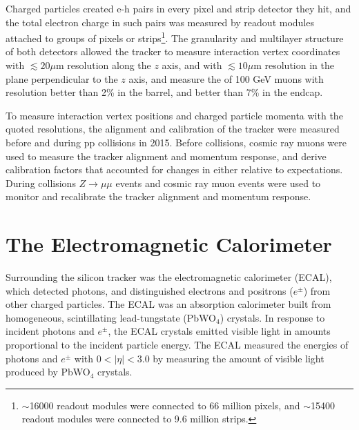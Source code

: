 Charged particles created e-h pairs in every pixel and strip detector they hit, and the total electron charge in such pairs was measured by readout 
modules attached to groups of pixels or strips\footnote{$\sim$16000 readout modules were connected to 66 million pixels, 
and $\sim$15400 readout modules were connected to 9.6 million strips.}.  
The granularity and multilayer structure of both detectors allowed the tracker to measure interaction vertex coordinates 
with $\lesssim 20\mu$m resolution along the $z$ axis, and with $\lesssim 10\mu$m resolution in the plane perpendicular to 
the $z$ axis, and measure the \pt of 100 GeV \pt muons with resolution better than 2\% in the barrel, and better than 
7\% in the endcap.

To measure interaction vertex positions and charged particle momenta with the quoted resolutions, the alignment and calibration 
of the tracker were measured before and during pp collisions in 2015.  Before collisions, cosmic ray muons were 
used to measure the tracker alignment and momentum response, and derive calibration factors that accounted for 
changes in either relative to expectations.  During collisions $Z \rightarrow \mu\mu$ events and cosmic ray muon events 
were used to monitor and recalibrate the tracker alignment and momentum response.


\section{The Electromagnetic Calorimeter}
\label{sec:ecalDescription}

Surrounding the silicon tracker was the electromagnetic calorimeter (ECAL), which detected photons, and distinguished
electrons and positrons ($e^{\pm}$) from other charged particles.  
The ECAL was an absorption calorimeter built from homogeneous, scintillating lead-tungstate (PbWO$_{4}$) crystals.  
In response to incident photons and $e^{\pm}$, the ECAL crystals emitted visible light in amounts proportional to 
the incident particle energy.  The ECAL measured the energies of photons and $e^{\pm}$ with $0 < |\eta| < 3.0$ by 
measuring the amount of visible light produced by PbWO$_{4}$ crystals.

